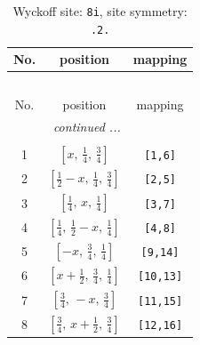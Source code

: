 \documentclass[fleqn,8pt]{jsarticle}
\begin{document}
\renewcommand{\arraystretch}{1.2}
\begin{longtable}{ccc}
\caption{Wyckoff site: {\tt 8i}, site symmetry: {\tt .2.}}
 \\
 \hline \hline
No. & position & mapping \\ \hline \endfirsthead

\multicolumn{2}{l}{\tablename\ \thetable{}} \\
 \hline \hline
No. & position & mapping \\ \hline \endhead

 \hline \hline
\multicolumn{2}{r}{\footnotesize\it continued ...} \\ \endfoot

 \hline \hline
\multicolumn{2}{r}{} \\ \endlastfoot

1 & $\left[ x,\, \frac{1}{4},\, \frac{3}{4} \right]$ & {\tt [1,6]} \\ \hline
2 & $\left[ \frac{1}{2} - x,\, \frac{1}{4},\, \frac{3}{4} \right]$ & {\tt [2,5]} \\ \hline
3 & $\left[ \frac{1}{4},\, x,\, \frac{1}{4} \right]$ & {\tt [3,7]} \\ \hline
4 & $\left[ \frac{1}{4},\, \frac{1}{2} - x,\, \frac{1}{4} \right]$ & {\tt [4,8]} \\ \hline
5 & $\left[ - x,\, \frac{3}{4},\, \frac{1}{4} \right]$ & {\tt [9,14]} \\ \hline
6 & $\left[ x + \frac{1}{2},\, \frac{3}{4},\, \frac{1}{4} \right]$ & {\tt [10,13]} \\ \hline
7 & $\left[ \frac{3}{4},\, - x,\, \frac{3}{4} \right]$ & {\tt [11,15]} \\ \hline
8 & $\left[ \frac{3}{4},\, x + \frac{1}{2},\, \frac{3}{4} \right]$ & {\tt [12,16]} \\
\end{longtable}
\renewcommand{\arraystretch}{1.2}
\end{document}
